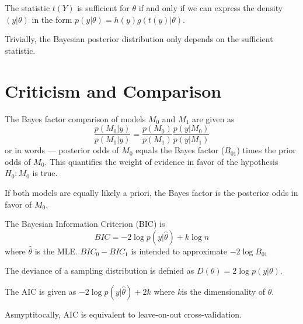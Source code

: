 \begin{thm}
  \label{sec:sampl-prop-relat-5}
  The statistic $t(Y)$ is sufficient for $\theta$ if and only if we
  can express the density $(y | \theta)$ in the form $p(y | \theta) =
  h(y) g(t(y) | \theta)$.

  Trivially, the Bayesian posterior distribution only depends on the
  sufficient statistic.
\end{thm}

\section{Criticism and Comparison}
\label{sec:criticism-comparison}

\begin{defn}
  \label{sec:criticism-comparison-1}
  The Bayes factor comparison of models $M_{0}$ and $M_{1}$ are given
  as
  \begin{equation}
    \label{eq:19}
    \frac{p(M_{0} | y)}{p(M_{1} | y)} = \frac{p(M_{0})}{p(M_{1})}
    \frac{p(y | M_{0})}{p(y | M_{1})}
  \end{equation}
  or in words --- posterior odds of $M_{0}$ equals the Bayes factor ($B_{01}$)
  times the prior odds of $M_{0}$.  This quantifies the weight of
  evidence in favor of the hypothesis $H_{0}: M_{0}$ is true.

  If both models are equally likely a priori, the Bayes factor is the
  posterior odds in favor of $M_{0}$.
\end{defn}

\begin{defn}
  \label{sec:criticism-comparison-2}
  The Bayesian Information Criterion (BIC) is
  \begin{equation}
    \label{eq:20}
    BIC = -2 \log p(y | \hat \theta) + k \log n
  \end{equation} where $\hat \theta$ is the MLE.
  $BIC_{0} - BIC_{1}$ is intended to approximate $-2 \log B_{01}$
\end{defn}

\begin{defn}
  \label{sec:criticism-comparison-3}
  The deviance of a sampling distribution is defnied as $D(\theta) = 2
  \log p(y | \theta)$.
\end{defn}

\begin{defn}
  \label{sec:criticism-comparison-4}
  The AIC is given as $-2 \log p(y | \hat \theta) + 2k$ where $k$is
  the dimensionality of $\theta$.

  Asmyptitocally, AIC is equivalent to leave-on-out cross-validation.
\end{defn}

